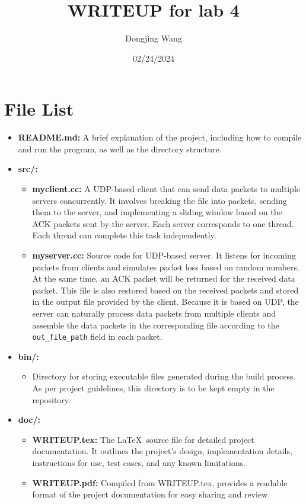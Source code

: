 \documentclass{article}
\title{WRITEUP for lab 4}
\author{Dongjing Wang}
\date{02/24/2024}
\begin{document}
\maketitle

\section*{File List}
\begin{itemize}
    \item \textbf{README.md:} A brief explanation of the project, including how to compile and run the program, as well as the directory structure.
    \item \textbf{src/:}
    \begin{itemize}
        \item \textbf{myclient.cc:} A UDP-based client that can send data packets to multiple servers concurrently. It involves breaking the file into packets, sending them to the server, and implementing a sliding window based on the ACK packets sent by the server. Each server corresponds to one thread. Each thread can complete this task independently.
        \item \textbf{myserver.cc:} Source code for UDP-based server. It listens for incoming packets from clients and simulates packet loss based on random numbers. At the same time, an ACK packet will be returned for the received data packet. This file is also restored based on the received packets and stored in the output file provided by the client. Because it is based on UDP, the server can naturally process data packets from multiple clients and assemble the data packets in the corresponding file according to the \texttt{out\_file\_path} field in each packet.

    \end{itemize}
    \item \textbf{bin/:}
    \begin{itemize}
        \item Directory for storing executable files generated during the build process. As per project guidelines, this directory is to be kept empty in the repository.
    \end{itemize}
    \item \textbf{doc/:}
    \begin{itemize}
        \item \textbf{WRITEUP.tex:} The \LaTeX\ source file for detailed project documentation. It outlines the project's design, implementation details, instructions for use, test cases, and any known limitations.
        \item \textbf{WRITEUP.pdf:} Compiled from WRITEUP.tex, provides a readable format of the project documentation for easy sharing and review.
    \end{itemize}
\end{itemize}
\end{document}
